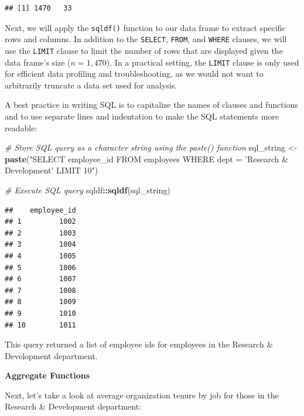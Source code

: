 \documentclass[]{book}
\newenvironment{Shaded}{\begin{snugshade}}{\end{snugshade}}
\newcommand{\CommentTok}[1]{\textcolor[rgb]{0.56,0.35,0.01}{\textit{#1}}}
\newcommand{\KeywordTok}[1]{\textcolor[rgb]{0.13,0.29,0.53}{\textbf{#1}}}
\newcommand{\NormalTok}[1]{#1}
\newcommand{\OperatorTok}[1]{\textcolor[rgb]{0.81,0.36,0.00}{\textbf{#1}}}
\newcommand{\StringTok}[1]{\textcolor[rgb]{0.31,0.60,0.02}{#1}}
\begin{document}
\begin{verbatim}
## [1] 1470   33
\end{verbatim}

Next, we will apply the \texttt{sqldf()} function to our data frame to extract specific rows and columns. In addition to the \texttt{SELECT}, \texttt{FROM}, and \texttt{WHERE} clauses, we will use the \texttt{LIMIT} clause to limit the number of rows that are displayed given the data frame's size (\(n = 1,470\)). In a practical setting, the \texttt{LIMIT} clause is only used for efficient data profiling and troubleshooting, as we would not want to arbitrarily truncate a data set used for analysis.

A best practice in writing SQL is to capitalize the names of clauses and functions and to use separate lines and indentation to make the SQL statements more readable:

\begin{Shaded}
\begin{Highlighting}[]
\CommentTok{# Store SQL query as a character string using the paste() function}
\NormalTok{sql_string <-}\StringTok{ }\KeywordTok{paste}\NormalTok{(}\StringTok{"SELECT}
\StringTok{                      employee_id}
\StringTok{                    FROM}
\StringTok{                      employees}
\StringTok{                    WHERE}
\StringTok{                      dept = 'Research & Development'}
\StringTok{                    LIMIT 10"}\NormalTok{)}

\CommentTok{# Execute SQL query}
\NormalTok{sqldf}\OperatorTok{::}\KeywordTok{sqldf}\NormalTok{(sql_string)}
\end{Highlighting}
\end{Shaded}

\begin{verbatim}
##    employee_id
## 1         1002
## 2         1003
## 3         1004
## 4         1005
## 5         1006
## 6         1007
## 7         1008
## 8         1009
## 9         1010
## 10        1011
\end{verbatim}

This query returned a list of employee ids for employees in the Research \& Development department.

\textbf{Aggregate Functions}

Next, let's take a look at average organization tenure by job for those in the Research \& Development department:
\end{document}
